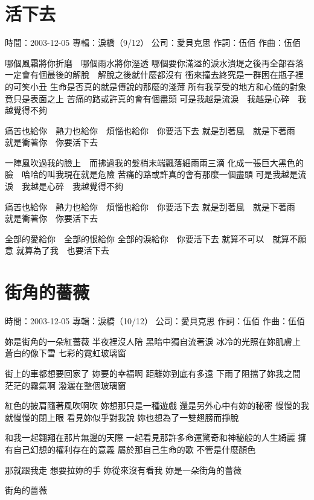 \documentclass[UTF8,a4paper,oneside,twocolumn,12pt]{ctexbook}
\newcommand{\infopair}[2]{\textbullet #1：#2}
\newcommand{\zc}[1][伍佰]{\infopair{作詞}{#1}}
\newcommand{\zq}[1][伍佰]{\infopair{作曲}{#1}}
\newcommand{\zj}[1]{\infopair{專輯}{#1}}
\newcommand{\sj}[1]{\infopair{時間}{#1}}
\newcommand{\gs}[1]{\infopair{公司}{#1}}
\newenvironment{info}{\begin{flushleft}\kaishu
	}
	{\end{flushleft}\normalsize\yahei\par}
\newenvironment{lyric}{
	}
{}
\begin{document}
\section{活下去}
\begin{info}
	\sj{2003-12-05}
	\zj{淚橋（9/12）}
	\gs{愛貝克思}
	\zc
	\zq
\end{info}
\begin{lyric}
	哪個風霜將你折磨　哪個雨水將你溼透
	哪個要你滿溢的淚水潰堤之後再全部吞落
	一定會有個最後的解脫　解脫之後就什麼都沒有
	衝來撞去終究是一群困在瓶子裡的可笑小丑
	生命是否真的就是傳說的那麼的淺薄
	所有我享受的地方和心儀的對象　竟只是表面之上
	苦痛的路或許真的會有個盡頭
	可是我越是流淚　我越是心碎　我越覺得不夠

	痛苦也給你　熱力也給你　煩惱也給你　你要活下去
	就是刮著風　就是下著雨　就是衝著你　你要活下去

	一陣風吹過我的臉上　而拂過我的髮梢末端飄落細雨兩三滴
	化成一張巨大黑色的臉　哈哈的叫我現在就是危險
	苦痛的路或許真的會有那麼一個盡頭
	可是我越是流淚　我越是心碎　我越覺得不夠

	痛苦也給你　熱力也給你　煩惱也給你　你要活下去
	就是刮著風　就是下著雨　就是衝著你　你要活下去

	全部的愛給你　全部的恨給你
	全部的淚給你　你要活下去
	就算不可以　就算不願意
	就算為了我　也要活下去
\end{lyric}

\section{街角的薔薇}
\begin{info}
	\sj{2003-12-05}
	\zj{淚橋（10/12）}
	\gs{愛貝克思}
	\zc
	\zq
\end{info}
\begin{lyric}
	妳是街角的一朵紅薔薇 半夜裡沒人陪 黑暗中獨自流著淚
	冰冷的光照在妳肌膚上 蒼白的像下雪 七彩的霓虹玻璃窗

	街上的車都想要回家了 妳要的幸福啊 距離妳到底有多遠
	下雨了阻擋了妳我之間 茫茫的霧氣啊 潑灑在整個玻璃窗

	紅色的披肩隨著風吹啊吹 妳想那只是一種遊戲 還是另外心中有妳的秘密
	慢慢的我就慢慢的閉上眼 看見妳似乎對我說 妳也想為了一雙翅膀而掙脫

	和我一起翱翔在那片無邊的天際 一起看見那許多命運驚奇和神秘般的人生綺麗
	擁有自己幻想的權利存在的意義 屬於那自己生命的歌 不管是什麼顏色

	那就跟我走 想要拉妳的手
	妳從來沒有看我
	妳是一朵街角的薔薇

	街角的薔薇
\end{lyric}
\end{document}
